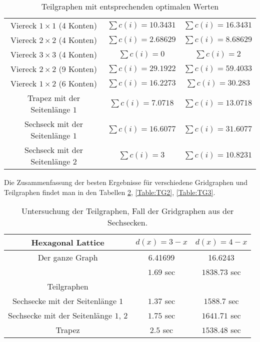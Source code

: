 \documentclass[
	fontsize=12pt,
	paper=a4,
	twoside=false,
	numbers=noenddot,
	plainheadsepline,
	toc=listof,
	toc=bibliography
]{scrartcl}
\begin{document}
\begin{itemize}
\begin{table}[htbp]
\begin{tabular}{|c|c|c|}
		Viereck $1\times 1$ (4 Konten) &  $\sum{c(i)}=10.3431$ & $\sum{c(i)}=16.3431$ \\ 
		Viereck $2\times 2$ (4 Konten) &  $\sum{c(i)}=2.68629$ & $\sum{c(i)}=8.68629$ \\ 
		Viereck $3\times 3$ (4 Konten) &  $\sum{c(i)}=0$ & $\sum{c(i)}=2$ \\ 
		
		Viereck $2\times 2$ (9 Konten) &  $\sum{c(i)}=29.1922$ & $\sum{c(i)}=59.4033$ \\  
		
		Viereck $1\times 2$ (6 Konten) &  $\sum{c(i)}=16.2273$ & $\sum{c(i)}=30.283$ \\  \hline
		
		Trapez mit der Seitenlänge $1$ &  $\sum{c(i)}=7.0718$ & $\sum{c(i)}=13.0718$ \\ \hline
		
		Sechseck mit der Seitenlänge $1$ & $\sum{c(i)}=16.6077$ & $\sum{c(i)}=31.6077$ \\
		Sechseck mit der Seitenlänge $2$ & $\sum{c(i)}=3$ & $\sum{c(i)}=10.8231$ \\ \hline
		
	\end{tabular}
	\caption{Teilgraphen mit entsprechenden optimalen Werten} 
	\label{Table:TG0}
	\end{table}
	
	Die Zusammenfassung der besten Ergebnisse für verschiedene Gridgraphen und Teilgraphen findet man in den Tabellen \ref{Table:TG1}, \ref{Table:TG2}, \ref{Table:TG3}.

	\begin{table}[htbp]
	\centering
	\begin{tabular}{|c|c|c|}
	\hline Hexagonal Lattice& $d(x)=3-x$  & $d(x)=4-x$\\ \hline 
		Der ganze Graph	&  6.41699	& 16.6243 \\ 
			& $1.69$ sec	& $1838.73$ sec \\ \hline
		Teilgraphen & & \\\hline
		Sechsecke mit der Seitenlänge $1$& $1.37$ sec	&  $1588.7$ sec \\ \hline
		Sechsecke mit der Seitenlänge $1$, $2$	& $1.75$ sec	&  $1641.71$ sec \\ \hline
		Trapez& $2.5$ sec  &  $1538.48$ sec \\ \hline
	\end{tabular}
	\caption{Untersuchung der Teilgraphen, Fall der Gridgraphen aus der Sechsecken.} 
	\label{Table:TG1}
	\end{table}
	

\end{itemize}
\end{document}
